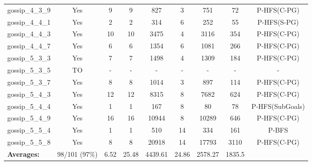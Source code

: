 \documentclass{article}
\begin{document}
\begin{tabular}{lcccccccc}
gossip\_4\_3\_9 & Yes & 9 & 9 & 827 & 3 & 751 & 72 & P-HFS(C-PG) \\
gossip\_4\_4\_1 & Yes & 2 & 2 & 314 & 6 & 252 & 55 & P-HFS(S-PG) \\
gossip\_4\_4\_3 & Yes & 10 & 10 & 3475 & 4 & 3116 & 354 & P-HFS(C-PG) \\
gossip\_4\_4\_7 & Yes & 6 & 6 & 1354 & 6 & 1081 & 266 & P-HFS(C-PG) \\
gossip\_5\_3\_3 & Yes & 7 & 7 & 1498 & 4 & 1309 & 184 & P-HFS(C-PG) \\
gossip\_5\_3\_5 & TO & - & - & - & - & - & - & - \\
gossip\_5\_3\_7 & Yes & 8 & 8 & 1014 & 3 & 897 & 114 & P-HFS(C-PG) \\
gossip\_5\_4\_3 & Yes & 12 & 12 & 8315 & 8 & 7682 & 624 & P-HFS(C-PG) \\
gossip\_5\_4\_4 & Yes & 1 & 1 & 167 & 8 & 80 & 78 & P-HFS(SubGoals) \\
gossip\_5\_4\_9 & Yes & 16 & 16 & 10944 & 8 & 10289 & 646 & P-HFS(C-PG) \\
gossip\_5\_5\_4 & Yes & 1 & 1 & 510 & 14 & 334 & 161 & P-BFS \\
gossip\_5\_5\_8 & Yes & 8 & 8 & 20918 & 14 & 17793 & 3110 & P-HFS(C-PG) \\
\textbf{Averages:} & 98/101 (97\%) & 6.52 & 25.48 & 4439.61 & 24.86 & 2578.27 & 1835.5 & \\
\bottomrule
\end{tabular}
\\[0.7cm]
\end{document}
